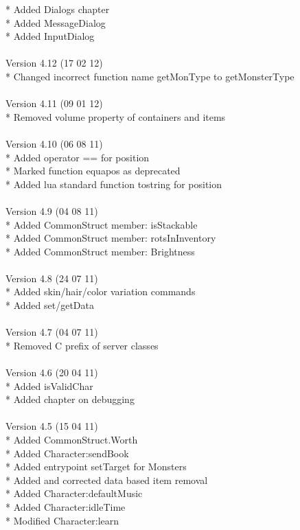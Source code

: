 \documentclass[a4paper,10pt,makeidx]{scrreprt}
\begin{document}
* Added Dialogs chapter\\
* Added MessageDialog\\
* Added InputDialog\\
\\
Version 4.12 (17 02 12)\\
* Changed incorrect function name getMonType to getMonsterType\\
\\
Version 4.11 (09 01 12)\\
* Removed volume property of containers and items\\
\\
Version 4.10 (06 08 11)\\
* Added operator == for position\\
* Marked function equapos as deprecated\\
* Added lua standard function tostring for position\\
\\
Version 4.9 (04 08 11)\\
* Added CommonStruct member: isStackable\\
* Added CommonStruct member: rotsInInventory\\
* Added CommonStruct member: Brightness\\
\\
Version 4.8 (24 07 11)\\
* Added skin/hair/color variation commands\\
* Added set/getData\\
\\
Version 4.7 (04 07 11)\\
* Removed C prefix of server classes\\
\\
Version 4.6 (20 04 11)\\
* Added isValidChar\\
* Added chapter on debugging\\
\\
Version 4.5 (15 04 11)\\
* Added CommonStruct.Worth\\
* Added Character:sendBook\\
* Added entrypoint setTarget for Monsters\\
* Added and corrected data based item removal\\
* Added Character:defaultMusic\\
* Added Character:idleTime\\
* Modified Character:learn\\
\end{document}

